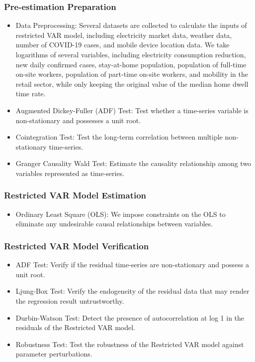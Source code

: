 \documentclass[10pt]{article}
\numberwithin{equation}{section}
\numberwithin{table}{section}
\numberwithin{figure}{section}
\begin{document}
\subsubsection{Pre-estimation Preparation}
\begin{itemize}
  \item Data Preprocessing: Several datasets are collected to calculate the inputs of restricted VAR model, including electricity market data, weather data, number of COVID-19 cases, and mobile device location data. We take logarithms of several variables, including electricity consumption reduction, new daily confirmed cases, stay-at-home population, population of full-time on-site workers, population of part-time on-site workers, and mobility in the retail sector, while only keeping the original value of the median home dwell time rate.
  \item Augmented Dickey-Fuller (ADF) Test: Test whether a time-series variable is non-stationary and possesses a unit root.
  \item Cointegration Test: Test the long-term correlation between multiple non-stationary time-series.
  \item Granger Causality Wald Test: Estimate the causality relationship among two variables represented as time-series.
\end{itemize}
\subsubsection{Restricted VAR Model Estimation}
\begin{itemize}
  \item  Ordinary Least Square (OLS): We impose constraints on the OLS to eliminate any undesirable causal relationships between variables.
\end{itemize}
\subsubsection{Restricted VAR Model Verification}
\begin{itemize}
  \item ADF Test: Verify if the residual time-series are non-stationary and possess a unit root.
  \item Ljung-Box Test: Verify the endogeneity of the residual data that may render the regression result untrustworthy.
  \item Durbin-Watson Test: Detect the presence of autocorrelation at log 1 in the residuals of the Restricted VAR model.
  \item Robustness Test: Test the robustness of the Restricted VAR model against parameter perturbations.
\end{itemize}
\end{document}
